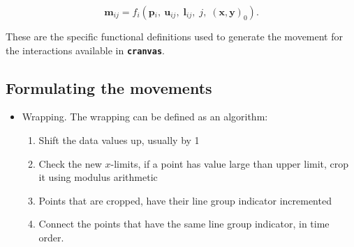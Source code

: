\documentclass[12pt]{article}
\begin{document}
\[
\mathbf{m}{}_{ij}=f_{i}(\mathbf{p}{}_{i},\:\mathbf{u}{}_{ij},\;\mathbf{l}_{ij},\; j,\; (\mathbf{x},\mathbf{y})_{0} ).
\]

\noindent These are the specific functional definitions used to generate the movement for the interactions available in \texttt{\textbf{cranvas}}.

\subsection{Formulating the movements}

\begin{itemize} \itemsep 0in

\item Wrapping. The wrapping can be defined as an algorithm:

\begin{enumerate} \itemsep 0in
\item Shift the data values up, usually by 1
\item Check the new $x$-limits, if a point has value large than upper limit, crop it using modulus arithmetic
\item Points that are cropped, have their line group indicator incremented
\item Connect the points that have the same line group indicator, in time order.
\end{enumerate}


\end{itemize}
\end{document}
